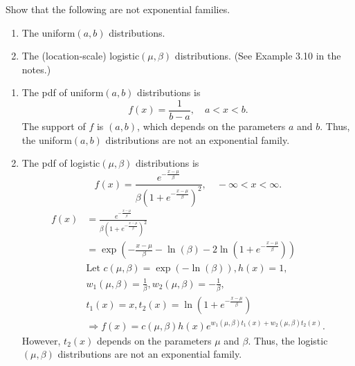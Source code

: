 \documentclass[12pt]{article}
\newenvironment{problem}[2][Problem]{\begin{trivlist}
\item[\hskip \labelsep {\bfseries #1}\hskip \labelsep {\bfseries #2.}]}
{\end{trivlist}}
\begin{document}
\begin{problem}{8}
  Show that the following are not exponential families.
  \begin{enumerate}
    \item The uniform$(a, b)$ distributions.
    \item The (location-scale) logistic$(\mu, \beta)$ distributions. (See Example 3.10 in the notes.)
  \end{enumerate}
  \begin{enumerate}
    \item The pdf of uniform$(a, b)$ distributions is
    \[
      f(x) = \frac{1}{b-a}, \quad a < x < b.
    \]
    The support of $f$ is $(a,b)$, which depends on the parameters $a$ and $b$.
    Thus, the uniform$(a, b)$ distributions are not an exponential family.
    \item The pdf of logistic$(\mu, \beta)$ distributions is
    \[
      f(x) = \frac{e^{-\frac{x-\mu}{\beta}}}{\beta (1 + e^{-\frac{x-\mu}{\beta}})^2},
      \quad -\infty < x < \infty.
    \]
    \[
      \begin{aligned}
        f(x) &= \frac{e^{-\frac{x-\mu}{\beta}}}
        {\beta (1 + e^{-\frac{x-\mu}{\beta}})^2} \\
        &= \exp\left( -\frac{x-\mu}{\beta} - 
        \ln(\beta) - 2\ln(1 + e^{-\frac{x-\mu}{\beta}}) \right) \\
        &\text{Let } c(\mu, \beta) = \exp(-\ln(\beta)), h(x) = 1,\\
        &w_1(\mu, \beta) = \frac{1}{\beta}, w_2(\mu, \beta) = -\frac{1}{\beta},\\
        &t_1(x) = x, t_2(x) = \ln(1 + e^{-\frac{x-\mu}{\beta}})\\
        &\Rightarrow f(x) = c(\mu, \beta) h(x) e^{w_1(\mu, \beta) t_1(x) +
        w_2(\mu, \beta) t_2(x)}.
      \end{aligned}
    \]
    However, $t_2(x)$ depends on the parameters $\mu$ and $\beta$.
    Thus, the logistic$(\mu, \beta)$ distributions are not an exponential family.
  \end{enumerate}
\end{problem}
\end{document}
